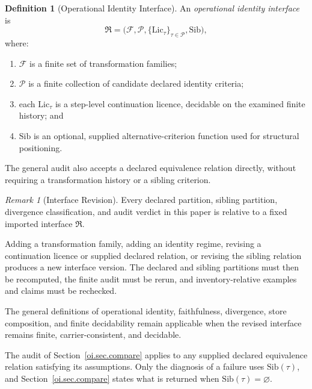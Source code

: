 \documentclass[11pt]{article}
\theoremstyle{plain}
\theoremstyle{definition}
\newtheorem{definition}[theorem]{Definition}
\theoremstyle{remark}
\newtheorem{remark}[theorem]{Remark}
\newcommand{\Lic}{\ensuremath{\mathrm{Lic}}}
\newcommand{\Fset}{\ensuremath{\mathcal{F}}}
\newcommand{\Sib}{\ensuremath{\mathrm{Sib}}}
\begin{document}
\begin{definition}[Operational Identity Interface]
  \label{oi.def.imported-interface}
  An \emph{operational identity interface} is
  \[
    \mathfrak{R}
    =
    \bigl(
    \Fset,
    \mathcal{P},
    \{\Lic_{\tau}\}_{\tau\in\mathcal{P}},
    \Sib
    \bigr),
  \]
  where:
  \begin{enumerate}[label=(\alph*)]
    \item \(\Fset\) is a finite set of transformation families;
    \item \(\mathcal{P}\) is a finite collection of candidate
          declared identity criteria;
    \item each \(\Lic_{\tau}\) is a step-level continuation
          licence, decidable on the examined finite history; and
    \item \(\Sib\) is an optional, supplied alternative-criterion
          function used for structural positioning.
  \end{enumerate}

  The general audit also accepts a declared equivalence relation
  directly, without requiring a transformation history
  or a sibling criterion.
\end{definition}

\begin{remark}[Interface Revision]
  \label{oi.rem.interface-revision}
  Every declared partition,
  sibling partition,
  divergence classification,
  and audit verdict in this paper
  is relative to a fixed imported interface \(\mathfrak{R}\).

  Adding a transformation family,
  adding an identity regime,
  revising a continuation licence or supplied declared relation,
  or revising the sibling relation
  produces a new interface version.
  The declared and sibling partitions must then be recomputed,
  the finite audit must be rerun,
  and inventory-relative examples and claims must be rechecked.

  The general definitions of operational identity,
  faithfulness,
  divergence,
  store composition,
  and finite decidability remain applicable
  when the revised interface remains finite,
  carrier-consistent,
  and decidable.
\end{remark}

The audit of Section~\ref{oi.sec.compare} applies to any
supplied declared equivalence relation satisfying its assumptions.
Only the diagnosis of a failure uses \(\Sib(\tau)\),
and Section~\ref{oi.sec.compare} states what is returned
when \(\Sib(\tau)=\varnothing\).
\end{document}
